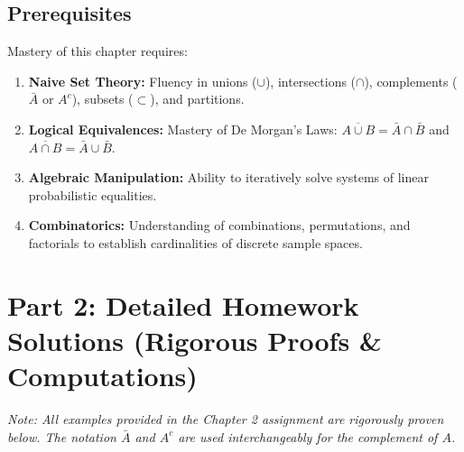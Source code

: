 \documentclass[12pt, a4paper]{article}
\theoremstyle{definition}
\theoremstyle{remark}
\newcommand{\1}{\mathbf{1}}
\begin{document}
\subsection{Prerequisites}
Mastery of this chapter requires:
\begin{enumerate}
    \item \textbf{Naive Set Theory:} Fluency in unions ($\cup$), intersections ($\cap$), complements ($\bar{A}$ or $A^c$), subsets ($\subset$), and partitions.
    \item \textbf{Logical Equivalences:} Mastery of De Morgan's Laws: $\overline{A \cup B} = \bar{A} \cap \bar{B}$ and $\overline{A \cap B} = \bar{A} \cup \bar{B}$.
    \item \textbf{Algebraic Manipulation:} Ability to iteratively solve systems of linear probabilistic equalities.
    \item \textbf{Combinatorics:} Understanding of combinations, permutations, and factorials to establish cardinalities of discrete sample spaces.
\end{enumerate}

\newpage

\section{Part 2: Detailed Homework Solutions (Rigorous Proofs \& Computations)}
\textit{Note: All examples provided in the Chapter 2 assignment are rigorously proven below. The notation $\bar{A}$ and $A^c$ are used interchangeably for the complement of $A$.}

\end{document}
